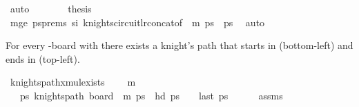 \begin{isabellebody}
\ auto\isanewline
\ \ \ \ \isamarkupfalse%
\ \isamarkupfalse%
\ {\isacharquery}{\kern0pt}thesis\isanewline
\ \ \ \ \ \ \isamarkupfalse%
\ m{\isacharunderscore}{\kern0pt}ge\ psprems\ si\ knights{\isacharunderscore}{\kern0pt}circuit{\isacharunderscore}{\kern0pt}lr{\isacharunderscore}{\kern0pt}concat{\isacharbrackleft}{\kern0pt}of\ {}\ {\isachardoublequoteopen}m{\isacharminus}{\kern0pt}{}{\isachardoublequoteclose}\ ps\ {}\ {\isacharquery}{\kern0pt}ps\ \isamarkupfalse%
\ auto\isanewline
\ \ \isamarkupfalse%
\isanewline
{}\isamarkupfalse%
%
\endisatagproof
{\isafoldproof}%
%
\isadelimproof
%
\endisadelimproof
%
\begin{isamarkuptext}%
For every -board with  there exists a knight's path that starts in 
 (bottom-left) and ends in  (top-left).%
\end{isamarkuptext}\isamarkuptrue%
\isamarkupfalse%
\ knights{\isacharunderscore}{\kern0pt}path{\isacharunderscore}{\kern0pt}{}xm{\isacharunderscore}{\kern0pt}ul{\isacharunderscore}{\kern0pt}exists{\isacharcolon}{\kern0pt}\ \isanewline
\ \ \ {\isachardoublequoteopen}m\ {\isasymge}\ {}{\isachardoublequoteclose}\ \isanewline
\ \ \ {\isachardoublequoteopen}{\isasymexists}ps{\isachardot}{\kern0pt}\ knights{\isacharunderscore}{\kern0pt}path\ {\isacharparenleft}{\kern0pt}board\ {}\ m{\isacharparenright}{\kern0pt}\ ps\ {\isasymand}\ hd\ ps\ {\isacharequal}{\kern0pt}\ {\isacharparenleft}{\kern0pt}{}{\isacharcomma}{\kern0pt}{}{\isacharparenright}{\kern0pt}\ {\isasymand}\ last\ ps\ {\isacharequal}{\kern0pt}\ {\isacharparenleft}{\kern0pt}{}{\isacharcomma}{\kern0pt}{}{\isacharparenright}{\kern0pt}{\isachardoublequoteclose}\isanewline
%
\isadelimproof
\ \ %
\endisadelimproof
%
\isatagproof
{}\isamarkupfalse%
\ assms\isanewline
{}\isamarkupfalse%
\ {\isacharminus}{\kern0pt}\isanewline
\ \ \isamarkupfalse%

\end{isabellebody}
